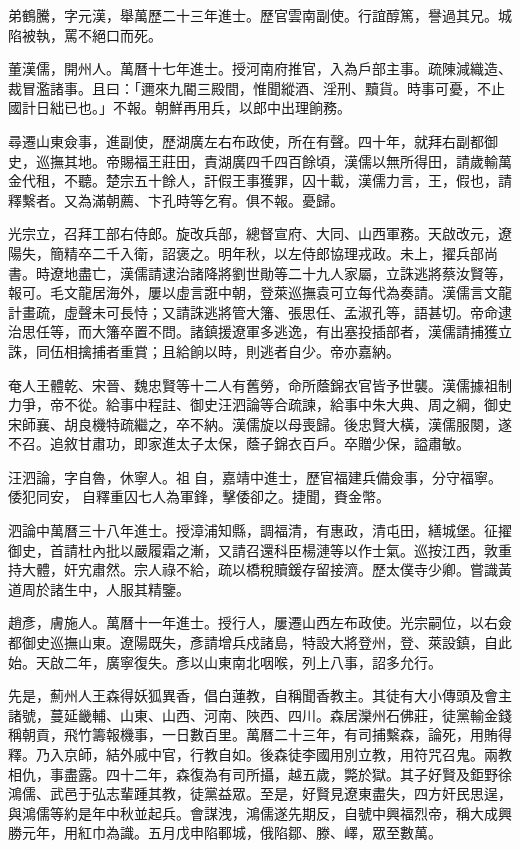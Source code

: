 \begin{pinyinscope}
弟鶴騰，字元漢，舉萬歷二十三年進士。歷官雲南副使。行誼醇篤，譽過其兄。城陷被執，罵不絕口而死。

董漢儒，開州人。萬曆十七年進士。授河南府推官，入為戶部主事。疏陳減織造、裁冒濫諸事。且曰：「邇來九閽三殿間，惟聞縱酒、淫刑、黷貨。時事可憂，不止國計日絀已也。」不報。朝鮮再用兵，以郎中出理餉務。

尋遷山東僉事，進副使，歷湖廣左右布政使，所在有聲。四十年，就拜右副都御史，巡撫其地。帝賜福王莊田，責湖廣四千四百餘頃，漢儒以無所得田，請歲輸萬金代租，不聽。楚宗五十餘人，訐假王事獲罪，囚十載，漢儒力言，王，假也，請釋繫者。又為滿朝薦、卞孔時等乞宥。俱不報。憂歸。

光宗立，召拜工部右侍郎。旋改兵部，總督宣府、大同、山西軍務。天啟改元，遼陽失，簡精卒二千入衛，詔褒之。明年秋，以左侍郎協理戎政。未上，擢兵部尚書。時遼地盡亡，漢儒請逮治諸降將劉世勛等二十九人家屬，立誅逃將蔡汝賢等，報可。毛文龍居海外，屢以虛言誑中朝，登萊巡撫袁可立每代為奏請。漢儒言文龍計畫疏，虛聲未可長恃；又請誅逃將管大籓、張思任、孟淑孔等，語甚切。帝命逮治思任等，而大籓卒置不問。諸鎮援遼軍多逃逸，有出塞投插部者，漢儒請捕獲立誅，同伍相擒捕者重賞；且給餉以時，則逃者自少。帝亦嘉納。

奄人王體乾、宋晉、魏忠賢等十二人有舊勞，命所蔭錦衣官皆予世襲。漢儒據祖制力爭，帝不從。給事中程註、御史汪泗論等合疏諫，給事中朱大典、周之綱，御史宋師襄、胡良機特疏繼之，卒不納。漢儒旋以母喪歸。後忠賢大橫，漢儒服闋，遂不召。追敘甘肅功，即家進太子太保，蔭子錦衣百戶。卒贈少保，謚肅敏。

汪泗論，字自魯，休寧人。祖自，嘉靖中進士，歷官福建兵備僉事，分守福寧。倭犯同安，自釋重囚七人為軍鋒，擊倭卻之。捷聞，賚金幣。

泗論中萬曆三十八年進士。授漳浦知縣，調福清，有惠政，清屯田，繕城堡。征擢御史，首請杜內批以嚴履霜之漸，又請召還科臣楊漣等以作士氣。巡按江西，敦重持大體，奸宄肅然。宗人祿不給，疏以橋稅贖鍰存留接濟。歷太僕寺少卿。嘗識黃道周於諸生中，人服其精鑒。

趙彥，膚施人。萬曆十一年進士。授行人，屢遷山西左布政使。光宗嗣位，以右僉都御史巡撫山東。遼陽既失，彥請增兵戍諸島，特設大將登州，登、萊設鎮，自此始。天啟二年，廣寧復失。彥以山東南北咽喉，列上八事，詔多允行。

先是，薊州人王森得妖狐異香，倡白蓮教，自稱聞香教主。其徒有大小傳頭及會主諸號，蔓延畿輔、山東、山西、河南、陜西、四川。森居灤州石佛莊，徒黨輸金錢稱朝貢，飛竹籌報機事，一日數百里。萬曆二十三年，有司捕繫森，論死，用賄得釋。乃入京師，結外戚中官，行教自如。後森徒李國用別立教，用符咒召鬼。兩教相仇，事盡露。四十二年，森復為有司所攝，越五歲，斃於獄。其子好賢及鉅野徐鴻儒、武邑于弘志輩踵其教，徒黨益眾。至是，好賢見遼東盡失，四方奸民思逞，與鴻儒等約是年中秋並起兵。會謀洩，鴻儒遂先期反，自號中興福烈帝，稱大成興勝元年，用紅巾為識。五月戊申陷鄆城，俄陷鄒、滕、嶧，眾至數萬。


\end{pinyinscope}
